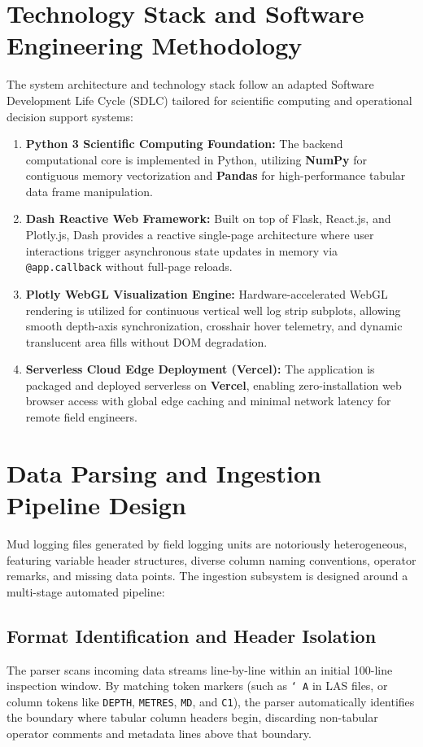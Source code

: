\section{Technology Stack and Software Engineering Methodology}

The system architecture and technology stack follow an adapted Software Development Life Cycle (SDLC) tailored for scientific computing and operational decision support systems:
\begin{enumerate}
    \item \textbf{Python 3 Scientific Computing Foundation:} The backend computational core is implemented in Python, utilizing \textbf{NumPy} for contiguous memory vectorization and \textbf{Pandas} for high-performance tabular data frame manipulation.
    \item \textbf{Dash Reactive Web Framework:} Built on top of Flask, React.js, and Plotly.js, Dash provides a reactive single-page architecture where user interactions trigger asynchronous state updates in memory via \texttt{@app.callback} without full-page reloads.
    \item \textbf{Plotly WebGL Visualization Engine:} Hardware-accelerated WebGL rendering is utilized for continuous vertical well log strip subplots, allowing smooth depth-axis synchronization, crosshair hover telemetry, and dynamic translucent area fills without DOM degradation.
    \item \textbf{Serverless Cloud Edge Deployment (Vercel):} The application is packaged and deployed serverless on \textbf{Vercel}, enabling zero-installation web browser access with global edge caching and minimal network latency for remote field engineers.
\end{enumerate}

\section{Data Parsing and Ingestion Pipeline Design}

Mud logging files generated by field logging units are notoriously heterogeneous, featuring variable header structures, diverse column naming conventions, operator remarks, and missing data points. The ingestion subsystem is designed around a multi-stage automated pipeline:

\subsection{Format Identification and Header Isolation}
The parser scans incoming data streams line-by-line within an initial 100-line inspection window. By matching token markers (such as \texttt{\char`~A} in LAS files, or column tokens like \texttt{DEPTH}, \texttt{METRES}, \texttt{MD}, and \texttt{C1}), the parser automatically identifies the boundary where tabular column headers begin, discarding non-tabular operator comments and metadata lines above that boundary.


